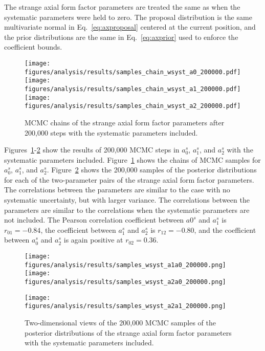     The strange axial form factor parameters are treated the same as when the
    systematic parameters were held to zero. The proposal distribution is the
    same multivariate normal in Eq.~\ref{eq:axproposal} centered at the current
    position, and the prior distributions are the same in Eq.~\ref{eq:axprior}
    used to enforce the coefficient bounds.

    \begin{figure}[h]
      \centering
      \texttt{[image: figures/analysis/results/samples\_chain\_wsyst\_a0\_200000.pdf]} \\
      \texttt{[image: figures/analysis/results/samples\_chain\_wsyst\_a1\_200000.pdf]} \\
      \texttt{[image: figures/analysis/results/samples\_chain\_wsyst\_a2\_200000.pdf]}
      \caption{MCMC chains of the strange axial form factor parameters after
      200,000 steps with the systematic parameters included.}
      \label{fig:chainws}
    \end{figure}
    Figures~\ref{fig:chainws}-\ref{fig:samplesws} show the results of 200,000
    MCMC steps in $a_0^s$, $a_1^s$, and $a_2^s$ with the systematic parameters
    included.  Figure~\ref{fig:chainws} shows the chains of MCMC samples for
    $a_0^s$, $a_1^s$, and $a_2^s$. Figure~\ref{fig:samplesws} shows the 200,000
    samples of the posterior distributions for each of the two-parameter pairs
    of the strange axial form factor parameters. The correlations between the
    parameters are similar to the case with no systematic uncertainty, but with
    larger variance. The correlations between the parameters are similar to the
    correlations when the systematic parameters are not included. The Pearson
    correlation coefficient between $a0^s$ and $a_1^s$ is $r_{01} = -0.84$, the
    coefficient between $a_1^s$ and $a_2^s$ is $r_{12} = -0.80$, and the
    coefficient between $a_0^s$ and $a_2^s$ is again positive at $r_{02} =
    0.36$.
    \begin{figure}[h]
      \texttt{[image: figures/analysis/results/samples\_wsyst\_a1a0\_200000.png]}
      \hspace{2pt}
      \texttt{[image: figures/analysis/results/samples\_wsyst\_a2a0\_200000.png]}
      \begin{flushright}
      \texttt{[image: figures/analysis/results/samples\_wsyst\_a2a1\_200000.png]}
      \end{flushright} 
      \caption{Two-dimensional views of the 200,000 MCMC samples of the
      posterior distributions of the strange axial form factor parameters with
      the systematic parameters included.}
      \label{fig:samplesws}
    \end{figure}


